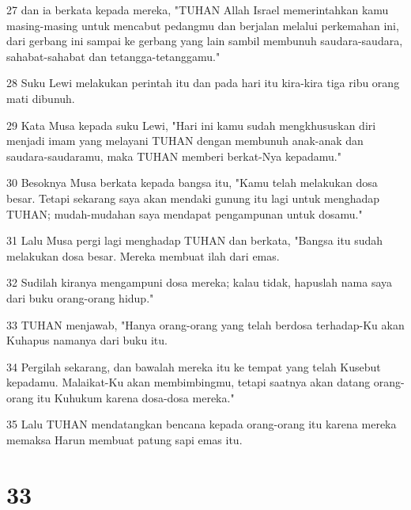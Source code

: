 \par 27 dan ia berkata kepada mereka, "TUHAN Allah Israel memerintahkan kamu masing-masing untuk mencabut pedangmu dan berjalan melalui perkemahan ini, dari gerbang ini sampai ke gerbang yang lain sambil membunuh saudara-saudara, sahabat-sahabat dan tetangga-tetanggamu."
\par 28 Suku Lewi melakukan perintah itu dan pada hari itu kira-kira tiga ribu orang mati dibunuh.
\par 29 Kata Musa kepada suku Lewi, "Hari ini kamu sudah mengkhususkan diri menjadi imam yang melayani TUHAN dengan membunuh anak-anak dan saudara-saudaramu, maka TUHAN memberi berkat-Nya kepadamu."
\par 30 Besoknya Musa berkata kepada bangsa itu, "Kamu telah melakukan dosa besar. Tetapi sekarang saya akan mendaki gunung itu lagi untuk menghadap TUHAN; mudah-mudahan saya mendapat pengampunan untuk dosamu."
\par 31 Lalu Musa pergi lagi menghadap TUHAN dan berkata, "Bangsa itu sudah melakukan dosa besar. Mereka membuat ilah dari emas.
\par 32 Sudilah kiranya mengampuni dosa mereka; kalau tidak, hapuslah nama saya dari buku orang-orang hidup."
\par 33 TUHAN menjawab, "Hanya orang-orang yang telah berdosa terhadap-Ku akan Kuhapus namanya dari buku itu.
\par 34 Pergilah sekarang, dan bawalah mereka itu ke tempat yang telah Kusebut kepadamu. Malaikat-Ku akan membimbingmu, tetapi saatnya akan datang orang-orang itu Kuhukum karena dosa-dosa mereka."
\par 35 Lalu TUHAN mendatangkan bencana kepada orang-orang itu karena mereka memaksa Harun membuat patung sapi emas itu.

\chapter{33}

